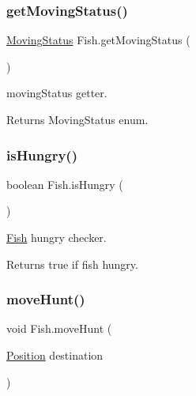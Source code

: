 \subsubsection{\texorpdfstring{get\+Moving\+Status()}{getMovingStatus()}}
{\footnotesize\ttfamily \mbox{\hyperlink{enum_moving_object_1_1_moving_status}{Moving\+Status}} Fish.\+get\+Moving\+Status (\begin{DoxyParamCaption}{ }\end{DoxyParamCaption})\hspace{0.3cm}{\ttfamily [inline]}}

moving\+Status getter. \begin{DoxyReturn}{Returns}
Moving\+Status enum. 
\end{DoxyReturn}
\mbox{\label{class_fish_aa4d669d1ffe1655a62c8b9ea5c477d72}} 
\subsubsection{\texorpdfstring{is\+Hungry()}{isHungry()}}
{\footnotesize\ttfamily boolean Fish.\+is\+Hungry (\begin{DoxyParamCaption}{ }\end{DoxyParamCaption})\hspace{0.3cm}{\ttfamily [inline]}}

\mbox{\hyperlink{class_fish}{Fish}} hungry checker. \begin{DoxyReturn}{Returns}
true if fish hungry. 
\end{DoxyReturn}
\mbox{\label{class_fish_a8ac2c9963873520d435ee1609dae0174}} 
\subsubsection{\texorpdfstring{move\+Hunt()}{moveHunt()}}
{\footnotesize\ttfamily void Fish.\+move\+Hunt (\begin{DoxyParamCaption}\item[{\mbox{\hyperlink{class_position}{Position}}}]{destination }\end{DoxyParamCaption})\hspace{0.3cm}{\ttfamily [inline]}}

